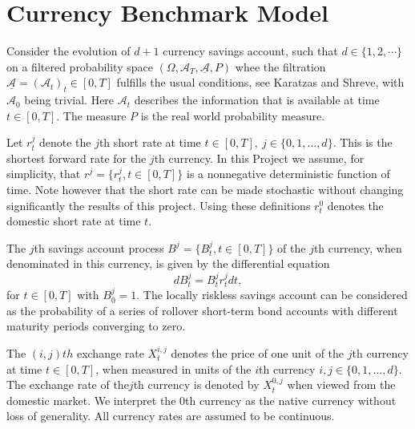 \documentclass[a4 paper, 12pt]{report}
\theoremstyle{plain}
\begin{document}
\section{Currency Benchmark Model}
Consider the evolution of %
$d+1$  currency savings account, such that $d\in\{1,2,\cdots\}$  on a filtered  probability space $(\Omega, \mathcal{A}_T,\underline{\mathcal{A}},P)$
whee the filtration $\underline{\mathcal{A}} = (\mathcal{A}_t)_t\in [0,T]$ fulfills the usual conditions,
see Karatzas and Shreve, with $\mathcal{A}_0$ being trivial. Here $\mathcal{A}_t$ describes the information that is available at time $t\in [0,T]$. The measure $P$ is the real world probability measure.\\
\noindent
\par Let $r_t^j$ denote the $j$th short rate at time $t\in [0,T],~j\in \{0,1,\ldots,d\}$. This is the shortest forward rate for the $j$th currency. In this Project  we assume, for simplicity, that $r^j = \{r_t^j,t\in[0,T]\}$ is a nonnegative deterministic function of time. Note however that the short rate can be made stochastic without changing significantly the results of this project. Using these definitions $r_t^0$ denotes the domestic short rate at time $t$.\\
\par The $j$th savings account process $B^j = \{B_t^j, t\in[0,T]\}$ of the $j$th currency, when denominated in this currency, is given by the differential equation
\begin{equation}\label{3.1}
dB_t^j = B_t^jr_t^jdt,
\end{equation}
for $t\in [0,T]$ with $B_0^j = 1$. The locally riskless savings account can be considered as the probability of a series of rollover short-term bond accounts with different maturity periods converging to zero.\\
\par The $(i,j)th$ exchange rate $X_t^{i,j}$ denotes the price of one unit of the $j$th currency at time $t\in[0,T]$,  when measured in units of the $i$th currency $i,j\in\{0,1,\ldots,d\}$.  The exchange rate of the$j$th currency is denoted by $X_t^{0,j}$ when viewed from the domestic market. We interpret the 0th currency as the native currency without loss of generality. All currency rates are assumed to be  continuous.%
\end{document}
